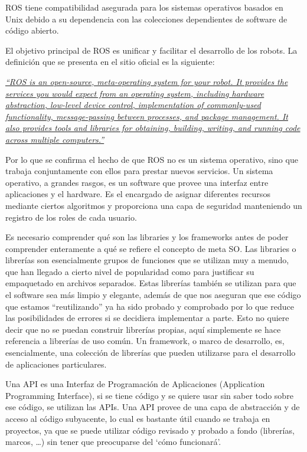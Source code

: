 ROS tiene compatibilidad asegurada para los sistemas operativos basados en Unix debido a su dependencia con las colecciones dependientes de software de código abierto.


El objetivo principal de ROS es unificar y facilitar el desarrollo de los robots. La definición que se presenta en el sitio oficial es la siguiente:

\href{http://wiki.ros.org/ROS/Introduction}{\textit{``ROS is an open-source, meta-operating system for your robot. It provides the services you would expect from an operating system, including hardware abstraction, low-level device control, implementation of commonly-used functionality, message-passing between processes, and package management. It also provides tools and libraries for obtaining, building, writing, and running code across multiple computers.''}}

Por lo que se confirma el hecho de que ROS no es un sistema operativo, sino que trabaja conjuntamente con ellos para prestar nuevos servicios. 
Un sistema operativo, a grandes rasgos, es un software que provee una interfaz entre aplicaciones y el hardware. Es el encargado de asignar diferentes recursos mediante ciertos algoritmos y proporciona una capa de seguridad manteniendo un registro de los roles de cada usuario.

Es necesario comprender qué son las libraries y los frameworks antes de poder comprender enteramente a qué se refiere el concepto de meta SO. Las libraries o librerías son esencialmente grupos de funciones que se utilizan muy a menudo, que han llegado a cierto nivel de popularidad como para justificar su empaquetado en archivos separados. Estas librerías también se utilizan para que el software sea más limpio y elegante, además de que nos aseguran que ese código que estamos ``reutilizando'' ya ha sido probado y comprobado por lo que reduce las posibilidades de errores si se decidiera implementar a parte. Esto no quiere decir que no se puedan construir librerías propias, aquí simplemente se hace referencia a librerías de uso común. Un framework, o marco de desarrollo, es, esencialmente, una colección de librerías que pueden utilizarse para el desarrollo de aplicaciones particulares.

Una API es una Interfaz de Programación de Aplicaciones (Application Programming Interface), si se tiene código y se quiere usar sin saber todo sobre ese código, se utilizan las APIs. Una API provee de una capa de abstracción y de acceso al código subyacente, lo cual es bastante útil cuando se trabaja en proyectos, ya que se puede utilizar código revisado y probado a fondo (librerías, marcos, …) sin tener que preocuparse del ‘cómo funcionará’.

